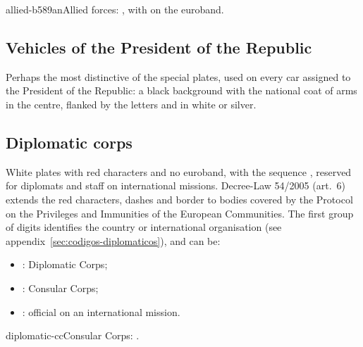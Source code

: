 %
          {allied-b589an}{Allied forces: , with  on the euroband.}

\subsection{Vehicles of the President of the Republic}

Perhaps the most distinctive of the special plates, used on every car assigned to
the President of the Republic: a black background with the national coat of arms
in the centre, flanked by the letters  and  in white or silver.


\subsection{Diplomatic corps}\label{sec:diplomaticos}

White plates with red characters and no euroband, with the sequence
, reserved for diplomats and staff on international missions.
Decree-Law 54/2005 (art.~6) extends the red characters, dashes and border to bodies
covered by the Protocol on the Privileges and Immunities of the European
Communities.
The first group of digits identifies the country or international organisation
(see appendix~\ref{sec:codigos-diplomaticos}), and  can be:
\begin{itemize}
  \item {}: Diplomatic Corps;
  \item {}: Consular Corps;
  \item {}: official on an international mission.
\end{itemize}

%
          {diplomatic-cc}{Consular Corps: .}
